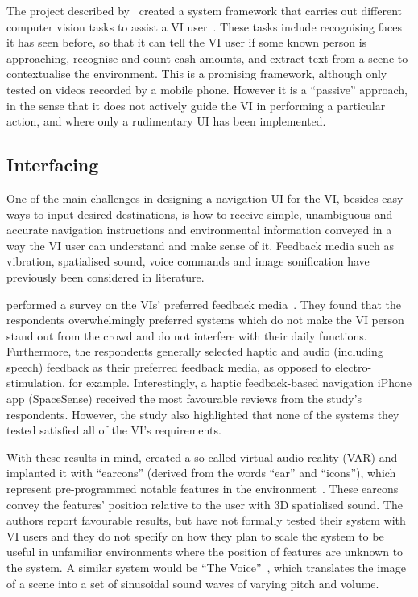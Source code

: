 \documentclass[format=sigconf, review=true, screen=true, anonymous=true]{acmart}
\begin{document}
The project described by~\citeauthor{chessa2016} created a system framework that carries out different computer vision tasks to assist a VI user~\cite{chessa2016}. These tasks include recognising faces it has seen before, so that it can tell the VI user if some known person is approaching, recognise and count cash amounts, and extract text from a scene to contextualise the environment. This is a promising framework, although only tested on videos recorded by a mobile phone. However it is a ``passive'' approach, in the sense that it does not actively guide the VI in performing a particular action, and where only a rudimentary UI has been implemented.

\subsection{Interfacing}

One of the main challenges in designing a navigation UI for the VI, besides easy ways to input desired destinations, is how to receive simple, unambiguous and accurate navigation instructions and environmental information conveyed in a way the VI user can understand and make sense of it. Feedback media such as vibration, spatialised sound, voice commands and image sonification have previously been considered in literature. 

\citeauthor{rogerio2014} performed a survey on the VIs' preferred feedback media~\cite{rogerio2014}. They found that the respondents overwhelmingly preferred systems which do not make the VI person stand out from the crowd and do not interfere with their daily functions. Furthermore, the respondents generally selected haptic and audio (including speech) feedback as their preferred feedback media, as opposed to electro-stimulation, for example. Interestingly, a haptic feedback-based navigation iPhone app (SpaceSense) received the most favourable reviews from the study's respondents. However, the study also highlighted that none of the systems they tested satisfied all of the VI's requirements.

With these results in mind, \citeauthor{frauenberger2003} created a so-called virtual audio reality (VAR) and implanted it with ``earcons'' (derived from the words ``ear'' and ``icons''), which represent pre-programmed notable features in the environment~\cite{frauenberger2003}. These earcons convey the features' position relative to the user with 3D spatialised sound. The authors report favourable results, but have not formally tested their system with VI users and they do not specify on how they plan to scale the system to be useful in unfamiliar environments where the position of features are unknown to the system. A similar system would be ``The Voice''~\cite{meijer2010}, which translates the image of a scene into a set of sinusoidal sound waves of varying pitch and volume.
\end{document}
